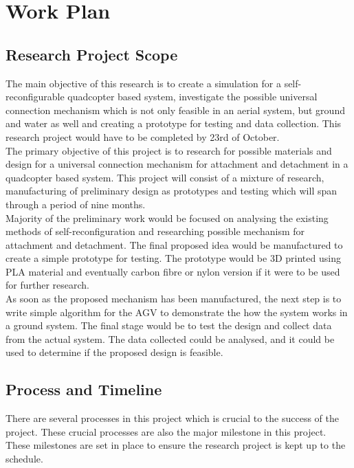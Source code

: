 \documentclass[12pt,A4]{article}
\begin{document}
	\section{Work Plan}
	
	\subsection{Research Project Scope}
	
	The main objective of this research is to create a simulation for a self-reconfigurable quadcopter based system, investigate the possible universal connection mechanism which is not only feasible in an aerial system, but ground and water as well and creating a prototype for testing and data collection. This research project would have to be completed by 23rd of October.\\
	
	The primary objective of this project is to research for possible materials and design for a universal connection mechanism for attachment and detachment in a quadcopter based system. This project will consist of a mixture of research, manufacturing of preliminary design as prototypes and testing which will span through a period of nine months.\\
	
	Majority of the preliminary work would be focused on analysing the existing methods of self-reconfiguration and researching possible mechanism for attachment and detachment. The final proposed idea would be manufactured to create a simple prototype for testing. The prototype would be 3D printed using PLA material and eventually carbon fibre or nylon version if it were to be used for further research.\\
	
	As soon as the proposed mechanism has been manufactured, the next step is to write simple algorithm for the AGV to demonstrate the how the system works in a ground system. The final stage would be to test the design and collect data from the actual system. The data collected could be analysed, and it could be used to determine if the proposed design is feasible.\\
	
	\subsection{Process and Timeline}
	
	There are several processes in this project which is crucial to the success of the project. These crucial processes are also the major milestone in this project. These milestones are set in place to ensure the research project is kept up to the schedule.\\
	
\end{document}
